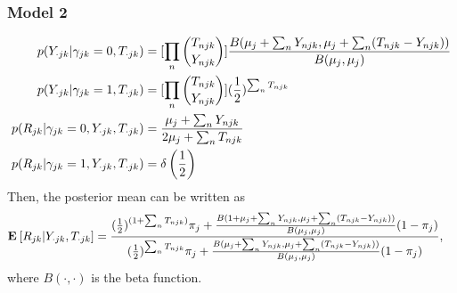 \documentclass[reqno]{amsart}
\numberwithin{equation}{section}
\begin{document}
\subsubsection{Model 2}
\begin{align}
    p(Y_{\cdot jk} | \gamma_{jk} =0, T_{\cdot jk}) 
       &= [\prod_{n} {T_{njk} \choose Y_{njk}}]  \frac{B(\mu_j + \sum_{n}Y_{njk} , \mu_j   
        +  \sum_{n}(T_{njk} - Y_{njk})     )}{B(\mu_j,\mu_j)}\\
    p(Y_{\cdot jk} | \gamma_{jk} =1, T_{\cdot jk})
       &= [\prod_{n} {T_{njk} \choose Y_{njk}}] (\frac{1}{2})^{\sum_{n}T_{njk}}\\
    p(R_{jk}  | \gamma_{jk} =0, Y_{\cdot jk}, T_{\cdot jk}) &=  \frac{\mu_j + \sum_{n}Y_{njk}}{2\mu_j +  \sum_{n}T_{njk}}\\
    p(R_{jk}  | \gamma_{jk} =1, Y_{\cdot jk}, T_{\cdot jk}) &=  \delta \left(\frac{1}{2} \right)
\end{align}
Then, the posterior mean can be written as
\begin{align}
  \mathbf{E}_{}\left[R_{jk} | Y_{\cdot jk}, T_{\cdot jk}\right]
      &=  \frac{(\frac{1}{2})^{(1+\sum_{n}T_{njk})} \pi_j 
        +  \frac{B(1+\mu_j + \sum_{n}Y_{njk} , \mu_j   +  \sum_{n}(T_{njk} - Y_{njk}))}{B(\mu_j,\mu_j)}(1-\pi_j)}
        { (\frac{1}{2})^{\sum_{n}T_{njk}} \pi_j + \frac{B(\mu_j + \sum_{n}Y_{njk} , \mu_j   +  \sum_{n}(T_{njk} - Y_{njk}) )}
        {B(\mu_j,\mu_j)}(1-\pi_j)  }, 
\end{align}
where $B(\cdot,\cdot)$ is the beta function.
\end{document}
